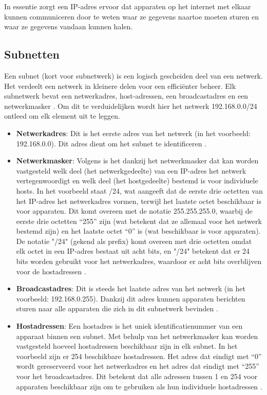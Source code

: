 In essentie zorgt een IP-adres ervoor dat apparaten op het internet met elkaar kunnen communiceren door te weten waar ze gegevens naartoe moeten sturen en waar ze gegevens vandaan kunnen halen.

\subsection{Subnetten}
Een subnet (kort voor subnetwerk) is een logisch gescheiden deel van een netwerk. Het verdeelt een netwerk in kleinere delen voor een efficiënter beheer. Elk subnetwerk bevat een netwerkadres, host-adressen, een broadcastadres en een netwerkmasker \autocite{Pummill1995}. Om dit te verduidelijken wordt hier het netwerk 192.168.0.0/24 ontleed om elk element uit te leggen.

\begin{itemize}
    \item \textbf{Netwerkadres}: Dit is het eerste adres van het netwerk (in het voorbeeld: 192.168.0.0). Dit adres dient om het subnet te identificeren \autocite{Braden1989}.
    \item \textbf{Netwerkmasker}: Volgens \textcite{Thomas2000} is het dankzij het netwerkmasker dat kan worden vastgesteld welk deel (het netwerkgedeelte) van een IP-adres het netwerk vertegenwoordigt en welk deel (het hostgedeelte) bestemd is voor individuele hosts. In het voorbeeld staat /24, wat aangeeft dat de eerste drie octetten van het IP-adres het netwerkadres vormen, terwijl het laatste octet beschikbaar is voor apparaten. Dit komt overeen met de notatie 255.255.255.0, waarbij de eerste drie octetten “255” zijn (wat betekent dat ze allemaal voor het netwerk bestemd zijn) en het laatste octet “0” is (wat beschikbaar is voor apparaten). De notatie "/24" (gekend als prefix) komt overeen met drie octetten omdat elk octet in een IP-adres bestaat uit acht bits, en "/24" betekent dat er 24 bits worden gebruikt voor het netwerkadres, waardoor er acht bits overblijven voor de hostadressen \autocite{Thomas2000}.      
    \item \textbf{Broadcastadres}: Dit is steeds het laatste adres van het netwerk (in het voorbeeld: 192.168.0.255). Dankzij dit adres kunnen apparaten berichten sturen naar alle apparaten die zich in dit subnetwerk bevinden \autocite{Braden1989}.
    \item \textbf{Hostadressen}: Een hostadres is het uniek identificatienummer van een apparaat binnen een subnet. Met behulp van het netwerkmasker kan worden vastgesteld hoeveel hostadressen beschikbaar zijn in elk subnet. In het voorbeeld zijn er 254 beschikbare hostadressen. Het adres dat eindigt met “0” wordt gereserveerd voor het netwerkadres en het adres dat eindigt met “255” voor het broadcastadres. Dit betekent dat alle adressen tussen 1 en 254 voor apparaten beschikbaar zijn om te gebruiken als hun individuele hostadressen \autocite{Thomas2000}.
\end{itemize}


